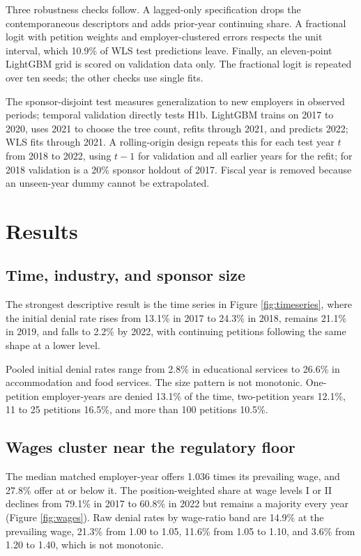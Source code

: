 \documentclass[9pt,twoside]{pnas-new}
\begin{document}
Three robustness checks follow. A lagged-only specification drops the contemporaneous descriptors and adds prior-year continuing share. A fractional logit with petition weights and employer-clustered errors respects the unit interval, which 10.9\% of WLS test predictions leave. Finally, an eleven-point LightGBM grid is scored on validation data only. The fractional logit is repeated over ten seeds; the other checks use single fits.

The sponsor-disjoint test measures generalization to new employers in observed periods; temporal validation directly tests H1b. LightGBM trains on 2017 to 2020, uses 2021 to choose the tree count, refits through 2021, and predicts 2022; WLS fits through 2021. A rolling-origin design repeats this for each test year $t$ from 2018 to 2022, using $t-1$ for validation and all earlier years for the refit; for 2018 validation is a 20\% sponsor holdout of 2017. Fiscal year is removed because an unseen-year dummy cannot be extrapolated.

\section*{Results}

\subsection*{Time, industry, and sponsor size}

The strongest descriptive result is the time series in Figure \ref{fig:timeseries}, where the initial denial rate rises from 13.1\% in 2017 to 24.3\% in 2018, remains 21.1\% in 2019, and falls to 2.2\% by 2022, with continuing petitions following the same shape at a lower level.

Pooled initial denial rates range from 2.8\% in educational services to 26.6\% in accommodation and food services. The size pattern is not monotonic. One-petition employer-years are denied 13.1\% of the time, two-petition years 12.1\%, 11 to 25 petitions 16.5\%, and more than 100 petitions 10.5\%.

\subsection*{Wages cluster near the regulatory floor}

The median matched employer-year offers 1.036 times its prevailing wage, and 27.8\% offer at or below it. The position-weighted share at wage levels I or II declines from 79.1\% in 2017 to 60.8\% in 2022 but remains a majority every year (Figure \ref{fig:wages}). Raw denial rates by wage-ratio band are 14.9\% at the prevailing wage, 21.3\% from 1.00 to 1.05, 11.6\% from 1.05 to 1.10, and 3.6\% from 1.20 to 1.40, which is not monotonic.
\end{document}
